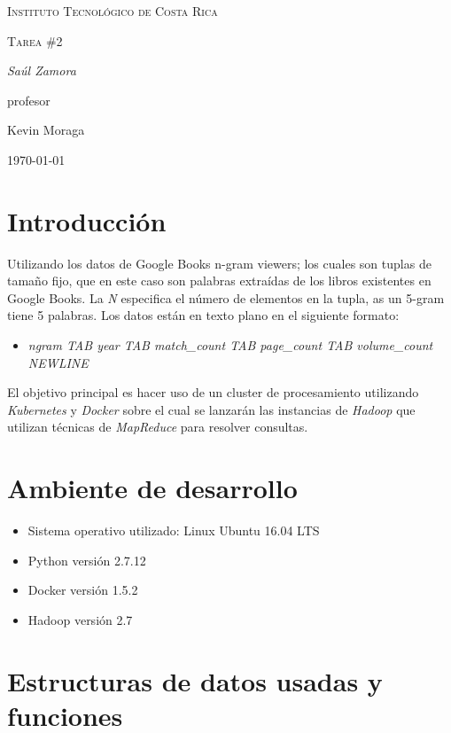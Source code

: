 \documentclass{article}
\begin{document}
\begin{titlepage}
  \centering
  {\scshape\LARGE Instituto Tecnol\'ogico de Costa Rica \par}
  \vspace{1cm}
  {\scshape\Large Tarea \#2\par}
  \vspace{1.5cm}
  {\Large\itshape Sa\'ul Zamora\par}
  \vfill
  profesor\par
  Kevin Moraga \textsc{}

  \vfill

  {\large \today\par}
\end{titlepage}

\section{Introducci\'on}
Utilizando los datos de Google Books n-gram viewers; los cuales son tuplas de tama\~no fijo, que en este caso son palabras extra\'idas de los libros existentes en Google Books. La \emph{N} especifica el n\'umero de elementos en la tupla, as un 5-gram tiene 5 palabras. Los datos est\'an en texto plano en el siguiente formato:
\begin{itemize}
  \item \emph{ngram TAB year TAB match\_count TAB page\_count TAB volume\_count NEWLINE}
\end{itemize}
El objetivo principal es hacer uso de un cluster de procesamiento utilizando \emph{Kubernetes} y \emph{Docker} sobre el cual se lanzar\'an las instancias de \emph{Hadoop} que utilizan t\'ecnicas de \emph{MapReduce} para resolver consultas.

\section{Ambiente de desarrollo}
\begin{itemize}
  \item Sistema operativo utilizado: Linux Ubuntu 16.04 LTS
  \item Python versi\'on 2.7.12
  \item Docker versi\'on 1.5.2
  \item Hadoop versi\'on 2.7
\end{itemize}

\section{Estructuras de datos usadas y funciones}
\end{document}
